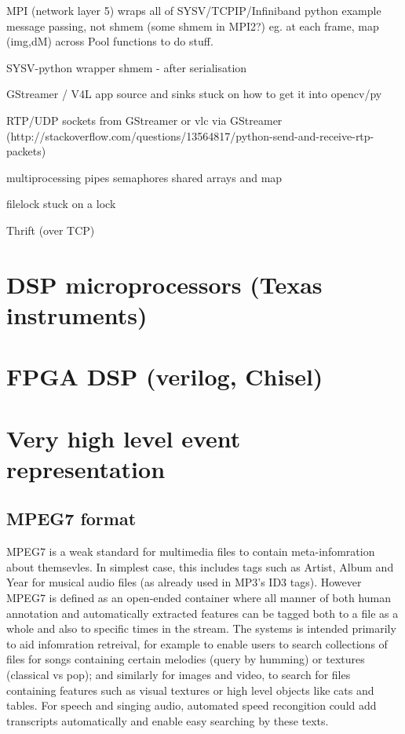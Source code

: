 \documentclass[oneside,english]{scrbook}
\begin{document}
MPI (network layer 5) wraps all of SYSV/TCPIP/Infiniband python example
message passing, not shmem (some shmem in MPI2?) eg. at each frame,
map (img,dM) across Pool functions to do stuff.

SYSV-python wrapper shmem - after serialisation

GStreamer / V4L app source and sinks stuck on how to get it into opencv/py

RTP/UDP sockets from GStreamer or vlc via GStreamer (http://stackoverflow.com/questions/13564817/python-send-and-receive-rtp-packets)

multiprocessing pipes semaphores shared arrays and map

filelock stuck on a lock

Thrift (over TCP)


\chapter{DSP microprocessors (Texas instruments)}

\chapter{FPGA DSP (verilog, Chisel)}


\chapter{Very high level event representation}

\section{MPEG7 format}

MPEG7 is a weak standard for multimedia files to contain meta-infomration about themsevles.  In simplest case, this includes tags such as Artist, Album and Year for musical audio files (as already used in MP3's ID3 tags).  However MPEG7 is defined as an open-ended container where all manner of both human annotation and automatically extracted features can be tagged both to a file as a whole and also to specific times in the stream.  The systems is intended primarily to aid infomration retreival, for example to enable users to search collections of files for songs containing certain melodies (query by humming) or textures (classical vs pop); and similarly for images and video, to search for files containing features such as visual textures or high level objects like cats and tables.   For speech and singing audio, automated speed recongition could add transcripts automatically and enable easy searching by these texts.
\end{document}
